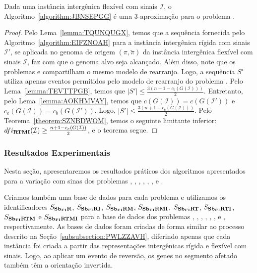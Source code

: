 \begin{theorem}\label{theorem:AKZNNSGT}
Dada uma instância intergênica flexível com sinais $\mathcal{I}$, o Algoritmo~\ref{algorithm:JBNSEPGG} é uma $3$-aproximação para o problema \SbFIRTMI{}.
\end{theorem}
\begin{proof}
Pelo Lema~\ref{lemma:TQUNQUGX}, temos que a sequência fornecida pelo Algoritmo~\ref{algorithm:EIFZNOAH} para a instância intergênica rígida com sinais $\mathcal{I'}$, se aplicada no genoma de origem $(\pi,\breve\pi)$ da instância intergênica flexível com sinais $\mathcal{I}$, faz com que o genoma alvo seja alcançado. Além disso, note que os problemas \SbIRTMI{} e \SbFIRTMI{} compartilham o mesmo modelo de rearranjo. Logo, a sequência $S'$ utiliza apenas eventos permitidos pelo modelo de rearranjo do problema \SbFIRTMI{}. Pelo Lema~\ref{lemma:TEVTTPGB}, temos que $|S'| \le \frac{3(n+1 - c_b(G(\mathcal{I})))}{2}$. Entretanto, pelo Lema~\ref{lemma:AOKHMVAY}, temos que $c(G(\mathcal{I})) = c(G(\mathcal{I}'))$ e $c_e(G(\mathcal{I})) = c_b(G(\mathcal{I}'))$. Logo, $|S'| \le \frac{3(n+1 - c_e(G(\mathcal{I})))}{2}$. Pelo Teorema~\ref{theorem:SZNBDWOM}, temos o seguinte limitante inferior: $dfi_{\textbf{RTMI}}(\mathcal{I}) \ge \frac{n+1 - c_e(G(\mathcal{I}))}{2}$, e o teorema segue.
\end{proof}

\subsubsection{Resultados Experimentais}

Nesta seção, apresentaremos os resultados práticos dos algoritmos apresentados para a variação com sinas dos problemas \SbFIR{}, \SbFIRI{}, \SbFIRM{}, \SbFIRMI{}, \SbFIRT{}, \SbFIRTI{}, \SbFIRTM{} e \SbFIRTMI{}.

Criamos também uma base de dados para cada problema e utilizamos os identificadores $S_{\textbf{Sb\textsubscript{FI}R}}{}$, $S_{\textbf{Sb\textsubscript{FI}RI}}{}$, $S_{\textbf{Sb\textsubscript{FI}RM}}{}$, $S_{\textbf{Sb\textsubscript{FI}RMI}}{}$, $S_{\textbf{Sb\textsubscript{FI}RT}}{}$, $S_{\textbf{Sb\textsubscript{FI}RTI}}{}$, $S_{\textbf{Sb\textsubscript{FI}RTM}}{}$ e $S_{\textbf{Sb\textsubscript{FI}RTMI}}{}$ para a base de dados dos problemas \SbFIR{}, \SbFIRI{}, \SbFIRM{}, \SbFIRMI{}, \SbFIRT{}, \SbFIRTI{}, \SbFIRTM{} e \SbFIRTMI{}, respectivamente. As bases de dados foram criadas de forma similar ao processo descrito na Seção~\ref{subsubsection:PWLZZAVH}, diferindo apenas que cada instância foi criada a partir das representações intergênicas rígida e flexível com sinais. Logo, ao aplicar um evento de reversão, os genes no segmento afetado também têm a orientação invertida.

